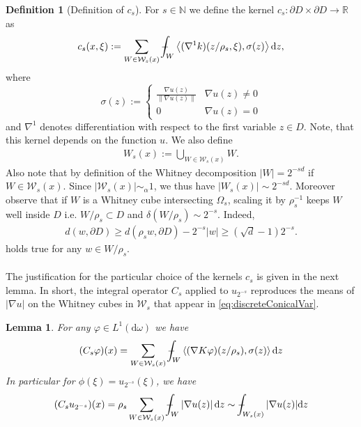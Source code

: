\documentclass[a4paper,12pt]{article}
\newtheorem{lemma}[theorem]{Lemma}
\theoremstyle{definition}
\theoremstyle{definition}
\newtheorem{definition}[theorem]{Definition}%
\def\Xint#1{\mathchoice
	{\XXint\displaystyle\textstyle{#1}}%
	{\XXint\textstyle\scriptstyle{#1}}%
	{\XXint\scriptstyle\scriptscriptstyle{#1}}%
	{\XXint\scriptscriptstyle\scriptscriptstyle{#1}}%
	\!\int}
\def\XXint#1#2#3{{\setbox0=\hbox{$#1{#2#3}{\int}$ }
		\vcenter{\hbox{$#2#3$ }}\kern-.568\wd0}}
\def\dashint{\Xint-}
\begin{document}
	\begin{definition}[Definition of $c_s$] 
		
		For $s\in\mathbb{N}$ we define the kernel $c_s:\partial D\times \partial D\longrightarrow\mathbb{R}$ as
		\begin{align}\label{def:csKernel}
			c_s(x,\xi):=\sum_{W\in\mathcal{W}_s(x)}\dashint_{W}\left\langle(\nabla^1k)(z/\rho_s,\xi),\sigma(z)\right\rangle\mathrm{d}z,
		\end{align}
		where 
		\[
		\sigma(z):=
		\begin{cases}
			\frac{\nabla u(z)}{\|\nabla u(z)\|} & \nabla u(z)\neq0\\
			0 & \nabla u(z)=0
		\end{cases}
		\]
		and $\nabla^1$ denotes differentiation with respect to the first variable $z\in D$. Note, that this kernel depends on the function $u$. We also define
		\begin{align*}
			W_s(x):=\bigcup_{W\in\mathcal{W}_s(x)}W.
		\end{align*}
		Also note that by definition of the Whitney decomposition $|W|=2^{-sd}$ if $W\in\mathcal{W}_s(x)$. Since $|\mathcal{W}_s(x)|\sim_\alpha1$, we thus have $|W_s(x)|\sim2^{-sd}$. Moreover observe that if $W$ is a Whitney cube intersecting $\Omega_s$, scaling it by $\rho_s^{-1}$ keeps $W$ well inside $D$ i.e. $W/\rho_s\subset D$ and $\delta(W/\rho_s)\sim 2^{-s}$. Indeed,
		\begin{align*}
			d(w,\partial D)\geq d(\rho_sw,\partial D)- 2^{-s}|w|\geq (\sqrt{d}-1)2^{-s}.
		\end{align*}
		holds true for any $w\in W/\rho_s$.
		\\\\
		The justification for the particular choice of the kernels $c_s$ is given in the next lemma. In short, the integral operator $C_s$ applied to $u_{2^{-s}}$ reproduces the means of $|\nabla u|$ on the Whitney cubes in $\mathcal{W}_s$ that appear in \eqref{eq:discreteConicalVar}.
	\end{definition}
	\begin{lemma}
		\label{lem:cy_properties}
		For any $\varphi\in L^1(\mathrm d\omega)$ we have
		\begin{align*}
			(C_s\varphi)(x)=\sum_{W\in\mathcal W_s(x)}\dashint_{W}\left\langle(\nabla K\varphi)(z/\rho_s),\sigma(z)\right\rangle \mathrm{d}z
		\end{align*}
		In particular for $\phi(\xi)=u_{2^{-s}}(\xi)$, we have 
		\begin{align*}
			(C_su_{2^{-s}})(x)= \rho_s\sum_{W\in\mathcal W_s(x)}\dashint_{W}\left|\nabla u(z)\right|\mathrm{d}z \sim\dashint_{W_s(x)}|\nabla u(z)|\mathrm{d}z
		\end{align*} 
	\end{lemma}
\end{document}
